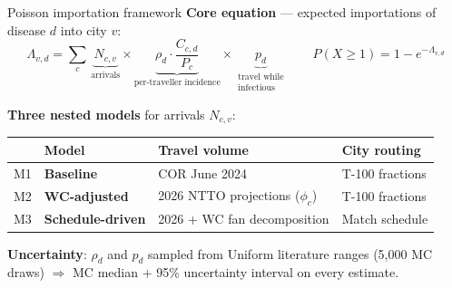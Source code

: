 \documentclass[aspectratio=169, 11pt]{beamer}
\begin{document}
\begin{frame}{Poisson importation framework}
  \textbf{Core equation} — expected importations of disease $d$
  into city $v$:
  \[
    \Lambda_{v,d}
    = \sum_{c}\,
      \underbrace{N_{c,v}}_{\text{arrivals}}
      \times
      \underbrace{\rho_d \cdot \frac{C_{c,d}}{P_c}}_{\text{per-traveller incidence}}
      \times
      \underbrace{p_d}_{\substack{\text{travel while}\\\text{infectious}}}
    \qquad
    P(X \geq 1) = 1 - e^{-\Lambda_{v,d}}
  \]

  \medskip
  \textbf{Three nested models} for arrivals $N_{c,v}$:
  \begin{center}
  \small
  \begin{tabular}{clll}
    \toprule
    & \textbf{Model} & \textbf{Travel volume} & \textbf{City routing} \\
    \midrule
    M1 & \textcolor{baseline}{\textbf{Baseline}}
       & COR June 2024 & T-100 fractions \\
    M2 & \textcolor{wcadj}{\textbf{WC-adjusted}}
       & 2026 NTTO projections ($\phi_c$) & T-100 fractions \\
    M3 & \textcolor{sched}{\textbf{Schedule-driven}}
       & 2026 + WC fan decomposition & Match schedule \\
    \bottomrule
  \end{tabular}
  \end{center}

  \medskip
  \textbf{Uncertainty}: $\rho_d$ and $p_d$ sampled from
  Uniform literature ranges (5,000 MC draws) $\Rightarrow$
  MC median $+$ 95\% uncertainty interval on every estimate.
\end{frame}
\end{document}
